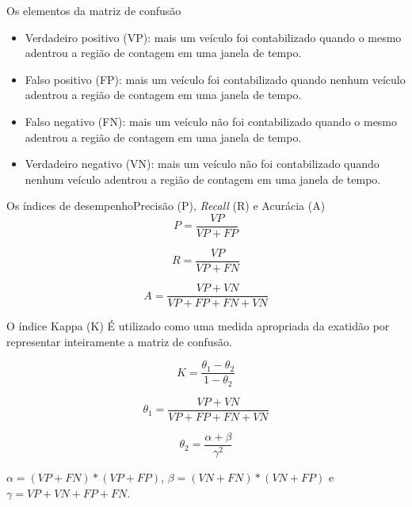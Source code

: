 \begin{frame}{Os elementos da matriz de confusão}
  \begin{itemize}
    \item Verdadeiro positivo (VP): mais um veículo foi contabilizado quando o mesmo adentrou a região de contagem em uma janela de tempo.
    \item Falso positivo (FP): mais um veículo foi contabilizado quando nenhum veículo adentrou a região de contagem em uma janela de tempo.
    \item Falso negativo (FN): mais um veículo não foi contabilizado quando o mesmo adentrou a região de contagem em uma janela de tempo.
    \pause
    \item Verdadeiro negativo (VN): mais um veículo não foi contabilizado quando nenhum veículo adentrou a região de contagem em uma janela de tempo.
\end{itemize}
\end{frame}

\begin{frame}{Os índices de desempenho}{Precisão (P), \textit{Recall} (R) e Acurácia (A)}
  \begin{equation}
    \label{eq:precisao}
    P=\dfrac{VP}{VP+FP}
  \end{equation}

  \begin{equation}
    \label{eq:recall}
    R=\dfrac{VP}{VP+FN}
  \end{equation}

  \begin{equation}
    \label{eq:acuracia}
    A=\dfrac{VP+VN}{VP+FP+FN+VN}
  \end{equation}
\end{frame}

\begin{frame}{O índice Kappa (K)}
  É utilizado como uma medida apropriada da exatidão por representar inteiramente a matriz de confusão.

  \begin{equation}
    \label{eq:kappa}
    K=\dfrac{\theta_{1}-\theta_{2}}{1-\theta_{2}}
  \end{equation}

  \begin{equation*}
    \label{eq:theta_1}
    \theta_{1}=\dfrac{VP+VN}{VP+FP+FN+VN}
  \end{equation*}

  \begin{equation*}
    \label{eq:theta_2}
    \theta_{2}=\dfrac{\alpha+\beta}{\gamma^{2}}
  \end{equation*}

  $\alpha=(VP+FN)*(VP+FP)$, $\beta=(VN+FN)*(VN+FP)$ e $\gamma=VP+VN+FP+FN$.

\end{frame} 


